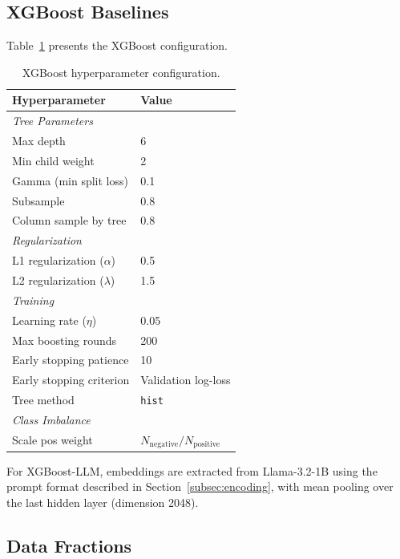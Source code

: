 \subsection{XGBoost Baselines}
\label{appendix:xgboost}

Table~\ref{tab:xgboost_config} presents the XGBoost configuration.

\begin{table}[h]
\centering
\caption{XGBoost hyperparameter configuration.}
\label{tab:xgboost_config}
\begin{tabular}{ll}
\toprule
Hyperparameter & Value \\
\midrule
\multicolumn{2}{l}{\textit{Tree Parameters}} \\
Max depth & 6 \\
Min child weight & 2 \\
Gamma (min split loss) & 0.1 \\
Subsample & 0.8 \\
Column sample by tree & 0.8 \\
\midrule
\multicolumn{2}{l}{\textit{Regularization}} \\
L1 regularization ($\alpha$) & 0.5 \\
L2 regularization ($\lambda$) & 1.5 \\
\midrule
\multicolumn{2}{l}{\textit{Training}} \\
Learning rate ($\eta$) & 0.05 \\
Max boosting rounds & 200 \\
Early stopping patience & 10 \\
Early stopping criterion & Validation log-loss \\
Tree method & \texttt{hist} \\
\midrule
\multicolumn{2}{l}{\textit{Class Imbalance}} \\
Scale pos weight & $N_{\text{negative}} / N_{\text{positive}}$ \\
\bottomrule
\end{tabular}
\end{table}

For XGBoost-LLM, embeddings are extracted from Llama-3.2-1B using the prompt format described in Section~\ref{subsec:encoding}, with mean pooling over the last hidden layer (dimension 2048).

\subsection{Data Fractions}
\label{appendix:fractions}

